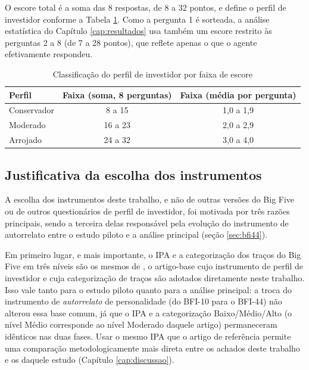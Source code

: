 O escore total é a soma das 8 respostas, de 8 a 32 pontos, e define o
perfil de investidor conforme a Tabela \ref{tab:ipa-classificacao}. Como
a pergunta 1 é sorteada, a análise estatística do Capítulo
\ref{cap:resultados} usa também um escore restrito às perguntas 2 a 8 (de
7 a 28 pontos), que reflete apenas o que o agente efetivamente respondeu.

\begin{table}[htb]
    \caption{Classificação do perfil de investidor por faixa de escore}
    \label{tab:ipa-classificacao}
    \centering
    \begin{tabular}{lcc}
        \toprule
        Perfil & Faixa (soma, 8 perguntas) & Faixa (média por pergunta) \\
        \midrule
        Conservador & 8 a 15  & 1,0 a 1,9 \\
        Moderado    & 16 a 23 & 2,0 a 2,9 \\
        Arrojado    & 24 a 32 & 3,0 a 4,0 \\
        \bottomrule
    \end{tabular}
\end{table}

\subsection{Justificativa da escolha dos instrumentos}

A escolha dos instrumentos deste trabalho, e não de outras versões do
Big Five ou de outros questionários de perfil de investidor, foi
motivada por três razões principais, sendo a terceira delas responsável
pela evolução do instrumento de autorrelato entre o estudo piloto e a
análise principal (seção \ref{sec:bfi44}).

Em primeiro lugar, e mais importante, o IPA e a categorização dos
traços do Big Five em três níveis são os mesmos de
, o artigo-base cujo instrumento de perfil de
investidor e cuja categorização de traços são adotados diretamente neste
trabalho. Isso vale tanto para o estudo piloto quanto para a análise
principal: a troca do instrumento de \textit{autorrelato} de
personalidade (do BFI-10 para o BFI-44) não alterou essa base comum, já
que o IPA e a categorização Baixo/Médio/Alto (o nível Médio corresponde
ao nível Moderado daquele artigo) permaneceram idênticos nas duas fases. Usar o mesmo IPA que o artigo de referência permite uma
comparação metodologicamente mais direta entre os achados deste trabalho
e os daquele estudo (Capítulo \ref{cap:discussao}).

